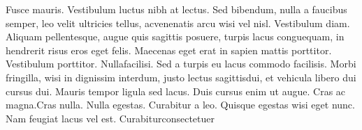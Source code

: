 \documentclass[../embeddings.tex]{subfiles}
\begin{document}
Fusce mauris. Vestibulum luctus nibh at lectus. Sed bibendum, nulla a faucibus semper, leo velit ultricies tellus, acvenenatis arcu wisi vel nisl. Vestibulum diam. Aliquam pellentesque, augue quis sagittis posuere, turpis lacus conguequam, in hendrerit risus eros eget felis. Maecenas eget erat in sapien mattis porttitor. Vestibulum porttitor. Nullafacilisi. Sed a turpis eu lacus commodo facilisis. Morbi fringilla, wisi in dignissim interdum, justo lectus sagittisdui, et vehicula libero dui cursus dui. Mauris tempor ligula sed lacus. Duis cursus enim ut augue. Cras ac magna.Cras nulla. Nulla egestas. Curabitur a leo. Quisque egestas wisi eget nunc. Nam feugiat lacus vel est. Curabiturconsectetuer
\end{document}
